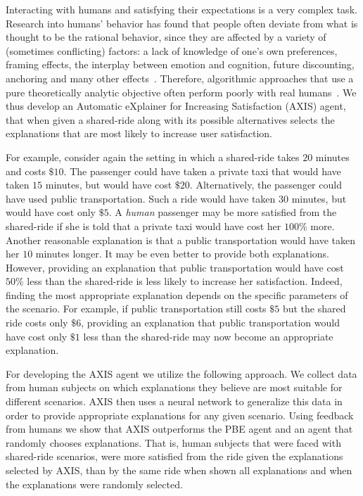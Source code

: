\documentclass[letterpaper]{article} %
\begin{document}
Interacting with humans and satisfying their expectations is a very complex task. Research into humans' behavior has found that people often deviate from what is thought to be the rational behavior, since they are affected by a variety of (sometimes conflicting) factors: a lack of knowledge of one's own preferences, framing effects, the interplay between emotion and cognition, future discounting, anchoring and many other effects~\cite{tversky81,Loewenstein00,ArielyAnchor,camerer03}.
Therefore, algorithmic approaches that use a pure theoretically analytic objective often perform poorly with real humans~\cite{Peledetal11,azaria2015strategic,nay2016predicting}.
We thus develop an Automatic eXplainer for Increasing Satisfaction (AXIS) agent, that when given a shared-ride along with its possible alternatives selects the explanations that are most likely to increase user satisfaction.

For example, consider again the setting in which a shared-ride takes $20$ minutes and costs $\$10$. 
The passenger could have taken a private taxi that would have taken $15$ minutes, but would have cost $\$20$. Alternatively, the passenger could have used public transportation. Such a ride would have taken $30$ minutes, but would have cost only $\$5$. 
A \emph{human} passenger may be more satisfied from the shared-ride if she is told that a private taxi would have cost her $100\%$ more. Another reasonable explanation is that a public transportation would have taken her $10$ minutes longer. It may be even better to provide both explanations. However, providing an explanation that public transportation would have cost $50\%$ less than the shared-ride is less likely to increase her satisfaction. Indeed, finding the most appropriate explanation depends on the specific parameters of the scenario. For example, if public transportation still costs $\$5$ but the shared ride costs only $\$6$, providing an explanation that public transportation would have cost only $\$1$ less than the shared-ride may now become an appropriate explanation. 

For developing the AXIS agent we utilize the following approach.
We collect data from human subjects on which explanations they believe are most suitable for different scenarios. AXIS then uses a neural network to generalize this data in order to provide appropriate explanations for any given scenario. Using feedback from humans we show that AXIS outperforms the PBE agent and an agent that randomly chooses explanations. That is, human subjects that were faced with shared-ride scenarios, were more satisfied from the ride given the explanations selected by AXIS, than by the same ride when shown all explanations and when the explanations were randomly selected.
\end{document}
